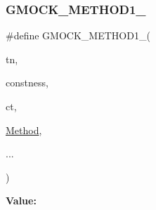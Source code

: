 \subsubsection{\texorpdfstring{GMOCK\_METHOD1\_}{GMOCK\_METHOD1\_}}
{\footnotesize\ttfamily \#define G\+M\+O\+C\+K\+\_\+\+M\+E\+T\+H\+O\+D1\+\_\+(\begin{DoxyParamCaption}\item[{}]{tn,  }\item[{}]{constness,  }\item[{}]{ct,  }\item[{}]{\mbox{\hyperlink{gmock-spec-builders__test_8cc_a95606368148f3e5aab5db46c32466afd}{Method}},  }\item[{}]{... }\end{DoxyParamCaption})}

{\bfseries Value\+:}
